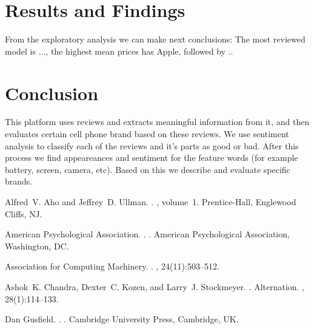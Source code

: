\documentclass[11pt]{article}
\begin{document}
\section{Results and Findings}
From the exploratory analysis we can make next conclusions: The most reviewed model is ..., the highest mean prices has Apple, followed by .. 


\section{Conclusion}
This platform uses reviews and extracts meaningful information from it, and then evaluates certain cell phone brand based on these reviews. We use sentiment analysis to classify each of the reviews and it's parts as good or bad. After this process we find appeareances and sentiment for the feature words (for example battery, screen, camera, etc). Based on this we describe and evaluate specific brands. 


\begin{thebibliography}{}

Alfred~V. Aho and Jeffrey~D. Ullman.
.
, volume~1.
\newblock Prentice-{Hall}, Englewood Cliffs, NJ.

{American Psychological Association}.
.
.
\newblock American Psychological Association, Washington, DC.

{Association for Computing Machinery}.
.
, 24(11):503--512.

Ashok~K. Chandra, Dexter~C. Kozen, and Larry~J. Stockmeyer.
.
\newblock Alternation.
,
  28(1):114--133.

Dan Gusfield.
.
.
\newblock Cambridge University Press, Cambridge, UK.

\end{thebibliography}
\end{document}
